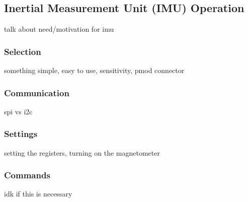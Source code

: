 \subsection{Inertial Measurement Unit (IMU) Operation}
talk about need/motivation for imu

\subsubsection{Selection}
something simple, easy to use, sensitivity, pmod connector

\subsubsection{Communication}
spi vs i2c


\subsubsection{Settings}
setting the registers, turning on the magnetometer

\subsubsection{Commands}
idk if this is necessary

